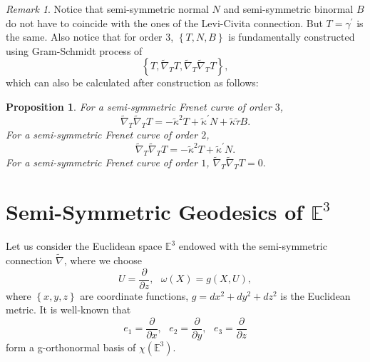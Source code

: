 \documentclass{amsart}
\theoremstyle{plain}
\newtheorem{proposition}{Proposition}
\theoremstyle{definition}
\theoremstyle{remark}
\newtheorem{remark}{Remark}
\numberwithin{equation}{section}
\begin{document}
\begin{remark}
Notice that semi-symmetric normal $N$ and semi-symmetric binormal $B$ do not
have to coincide with the ones of the Levi-Civita connection. But $T=\gamma
^{\prime }$ is the same. Also notice that for order $3$, $\left\{
T,N,B\right\} $ is fundamentally constructed using Gram-Schmidt process of 
\begin{equation*}
\left\{ T,\widetilde{\nabla }_{T}T,\widetilde{\nabla }_{T}\widetilde{\nabla }%
_{T}T\right\} ,
\end{equation*}%
which can also be calculated after construction as follows:

\begin{proposition}
For a semi-symmetric Frenet curve of order $3$,%
\begin{equation*}
\widetilde{\nabla }_{T}\widetilde{\nabla }_{T}T=-\widetilde{\kappa }^{2}T+%
\widetilde{\kappa }^{\prime }N+\widetilde{\kappa }\widetilde{\tau }B.
\end{equation*}%
For a semi-symmetric Frenet curve of order $2$,%
\begin{equation*}
\widetilde{\nabla }_{T}\widetilde{\nabla }_{T}T=-\widetilde{\kappa }^{2}T+%
\widetilde{\kappa }^{\prime }N.
\end{equation*}%
For a semi-symmetric Frenet curve of order $1$, $\widetilde{\nabla }_{T}%
\widetilde{\nabla }_{T}T=0.$
\end{proposition}
\end{remark}

\section{\label{sect-geodesicE3}Semi-Symmetric Geodesics of $\mathbb{E}^{3}$}

Let us consider the Euclidean space $\mathbb{E}^{3}$ endowed with the
semi-symmetric connection $\widetilde{\nabla }$, where we choose 
\begin{equation*}
U=\frac{\partial }{\partial z},\text{ }\omega \left( X\right) =g\left(
X,U\right) ,
\end{equation*}%
where $\left\{ x,y,z\right\} $ are coordinate functions, $%
g=dx^{2}+dy^{2}+dz^{2}$ is the Euclidean metric. It is well-known that 
\begin{equation*}
e_{1}=\frac{\partial }{\partial x},\text{ }e_{2}=\frac{\partial }{\partial y}%
,\text{ }e_{3}=\frac{\partial }{\partial z}
\end{equation*}%
form a g-orthonormal basis of $\chi \left( \mathbb{E}^{3}\right) $.
\end{document}
